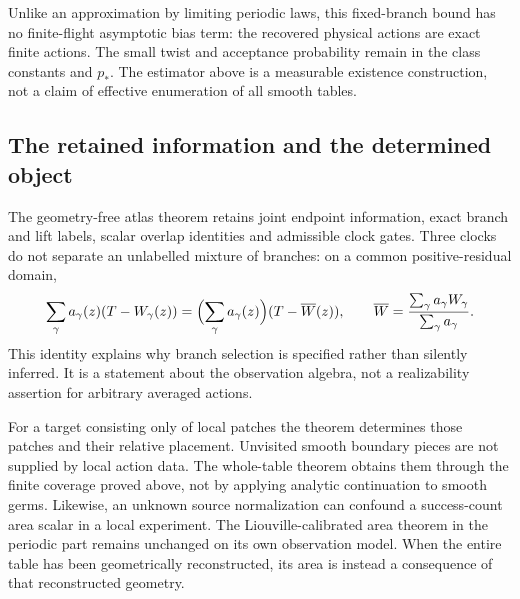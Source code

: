 Unlike an approximation by limiting periodic laws, this fixed-branch
bound has no finite-flight asymptotic bias term: the recovered physical
actions are exact finite actions.  The small twist and acceptance
probability remain in the class constants and $p_*$.  The estimator
above is a measurable existence construction, not a claim of effective
enumeration of all smooth tables.

\subsection{The retained information and the determined object}

The geometry-free atlas theorem retains joint endpoint information,
exact branch and lift labels, scalar overlap identities and admissible
clock gates.  Three clocks do not separate an unlabelled mixture of
branches: on a common positive-residual domain,
\[
 \sum_\gamma a_\gamma(z)(T-W_\gamma(z))
 =\Bigl(\sum_\gamma a_\gamma(z)\Bigr)(T-\overline W(z)),
 \qquad
 \overline W=\frac{\sum_\gamma a_\gamma W_\gamma}
                   {\sum_\gamma a_\gamma}.
\]
This identity explains why branch selection is specified rather than
silently inferred.  It is a statement about the observation algebra,
not a realizability assertion for arbitrary averaged actions.

For a target consisting only of local patches the theorem determines
those patches and their relative placement.  Unvisited smooth boundary
pieces are not supplied by local action data.  The whole-table theorem
obtains them through the finite coverage proved above, not by applying
analytic continuation to smooth germs.  Likewise, an unknown source
normalization can confound a success-count area scalar in a local
experiment.  The Liouville-calibrated area theorem in the periodic part
remains unchanged on its own observation model.  When the entire table
has been geometrically reconstructed, its area is instead a consequence
of that reconstructed geometry.
